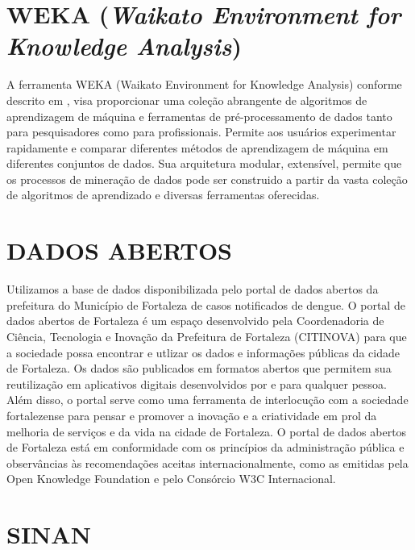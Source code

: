 \documentclass[
	12pt,				%
	openright,			%
	oneside,	
	a4paper,				%
	english,				%
	brazil				%
]{abntex2/abntex2} %
\begin{document}
	\section{WEKA (\textit{Waikato Environment for Knowledge Analysis})}
	
	A ferramenta WEKA (Waikato Environment for Knowledge Analysis)  conforme descrito em \cite{hall:2009}, visa proporcionar uma coleção abrangente de algoritmos de aprendizagem de máquina e ferramentas de pré-processamento de dados tanto para pesquisadores como para profissionais. Permite aos usuários experimentar rapidamente e comparar diferentes métodos de aprendizagem de máquina em diferentes conjuntos de dados. Sua arquitetura modular, extensível, permite que os processos de mineração de dados pode ser construido a partir da vasta coleção de algoritmos de aprendizado e diversas ferramentas oferecidas.
		
	\section{DADOS ABERTOS}

	Utilizamos a base de dados disponibilizada pelo portal de dados abertos da prefeitura do Município de Fortaleza de casos notificados de dengue. O portal de dados abertos de Fortaleza é um espaço desenvolvido pela Coordenadoria de Ciência, Tecnologia e Inovação da Prefeitura de Fortaleza (CITINOVA) para que a sociedade possa encontrar e utlizar os dados e informações públicas da cidade de Fortaleza. Os dados são publicados em formatos abertos que permitem sua reutilização em aplicativos digitais desenvolvidos por e para qualquer pessoa. Além disso, o portal serve como uma ferramenta de interlocução com a sociedade fortalezense para pensar e promover  a inovação e a criatividade em prol da melhoria de serviços e da vida na cidade de Fortaleza. O portal de dados abertos de Fortaleza está em conformidade com os princípios da administração pública e observâncias às recomendações aceitas internacionalmente, como as emitidas pela Open Knowledge Foundation e pelo Consórcio W3C Internacional.
		
		
	\section{SINAN}
	
\end{document}
